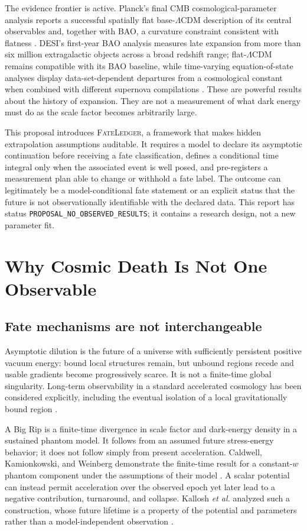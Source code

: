 \documentclass[conference]{IEEEtran}
\newcommand{\lcdm}{\ensuremath{\Lambda\mathrm{CDM}}}
\newcommand{\fateledger}{\textsc{FateLedger}}
\begin{document}
The evidence frontier is active. Planck's final CMB cosmological-parameter analysis reports a successful spatially flat base-\lcdm{} description of its central observables and, together with BAO, a curvature constraint consistent with flatness \cite{planck2018}. DESI's first-year BAO analysis measures late expansion from more than six million extragalactic objects across a broad redshift range; flat-\lcdm{} remains compatible with its BAO baseline, while time-varying equation-of-state analyses display data-set-dependent departures from a cosmological constant when combined with different supernova compilations \cite{desi2025}. These are powerful results about the history of expansion. They are not a measurement of what dark energy must do as the scale factor becomes arbitrarily large.

This proposal introduces \fateledger{}, a framework that makes hidden extrapolation assumptions auditable. It requires a model to declare its asymptotic continuation before receiving a fate classification, defines a conditional time integral only when the associated event is well posed, and pre-registers a measurement plan able to change or withhold a fate label. The outcome can legitimately be a model-conditional fate statement or an explicit status that the future is not observationally identifiable with the declared data. This report has status \texttt{PROPOSAL\_NO\_OBSERVED\_RESULTS}; it contains a research design, not a new parameter fit.

\section{Why Cosmic Death Is Not One Observable}

\subsection{Fate mechanisms are not interchangeable}

Asymptotic dilution is the future of a universe with sufficiently persistent positive vacuum energy: bound local structures remain, but unbound regions recede and usable gradients become progressively scarce. It is not a finite-time global singularity. Long-term observability in a standard accelerated cosmology has been considered explicitly, including the eventual isolation of a local gravitationally bound region \cite{loeb2011}.

A Big Rip is a finite-time divergence in scale factor and dark-energy density in a sustained phantom model. It follows from an assumed future stress-energy behavior; it does not follow simply from present acceleration. Caldwell, Kamionkowski, and Weinberg demonstrate the finite-time result for a constant-\(w\) phantom component under the assumptions of their model \cite{caldwell2003}. A scalar potential can instead permit acceleration over the observed epoch yet later lead to a negative contribution, turnaround, and collapse. Kallosh \emph{et al.} analyzed such a construction, whose future lifetime is a property of the potential and parameters rather than a model-independent observation \cite{kallosh2003}.
\end{document}
